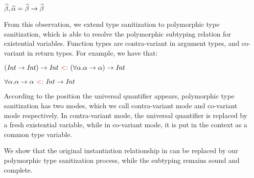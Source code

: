 $\widehat{\beta}, \widehat{\alpha} = \widehat{\beta} \to \widehat{\beta}$

From this observation, we extend type sanitization to polymorphic type
sanitization, which is able to resolve the polymorphic subtyping relation for
existential variables. Function types are contra-variant in argument
types, and co-variant in return types. For example, we have that:

$(\Int \to \Int) \to \Int \tsub (\forall \varA. \varA \to \varA) \to \Int $

$\forall \varA. \varA \to \varA \tsub \Int \to \Int$

\noindent According to the position the universal
quantifier appears, polymorphic type sanitization has two modes, which we call
contra-variant mode and co-variant mode respectively.
In contra-variant mode, the universal quantifier is replaced by a fresh
existential variable, while in co-variant mode, it is put in the context as a
common type variable.

We show that the original instantiation relationship in
\citet{dunfield2013complete} can be replaced by our polymorphic type
sanitization process, while the subtyping remains sound and complete.

